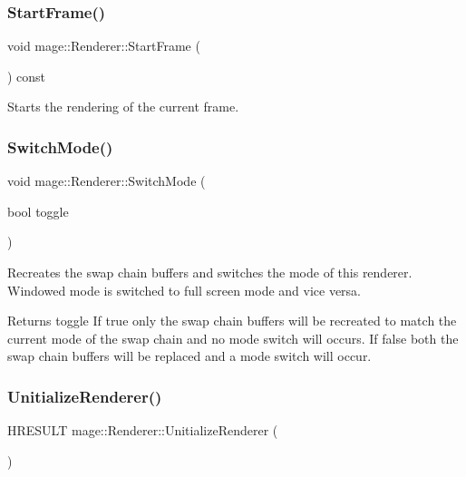 \subsubsection{\texorpdfstring{Start\+Frame()}{StartFrame()}}
{\footnotesize\ttfamily void mage\+::\+Renderer\+::\+Start\+Frame (\begin{DoxyParamCaption}{ }\end{DoxyParamCaption}) const}

Starts the rendering of the current frame. \hypertarget{classmage_1_1_renderer_a9004ab608659188900c808eacb5f873c}{}\label{classmage_1_1_renderer_a9004ab608659188900c808eacb5f873c} 
\subsubsection{\texorpdfstring{Switch\+Mode()}{SwitchMode()}}
{\footnotesize\ttfamily void mage\+::\+Renderer\+::\+Switch\+Mode (\begin{DoxyParamCaption}\item[{bool}]{toggle }\end{DoxyParamCaption})}

Recreates the swap chain buffers and switches the mode of this renderer. Windowed mode is switched to full screen mode and vice versa.

\begin{DoxyReturn}{Returns}
toggle If {\ttfamily true} only the swap chain buffers will be recreated to match the current mode of the swap chain and no mode switch will occurs. If {\ttfamily false} both the swap chain buffers will be replaced and a mode switch will occur. 
\end{DoxyReturn}
\hypertarget{classmage_1_1_renderer_a308beaf67b11128f02e87778b6a9c3c7}{}\label{classmage_1_1_renderer_a308beaf67b11128f02e87778b6a9c3c7} 
\subsubsection{\texorpdfstring{Unitialize\+Renderer()}{UnitializeRenderer()}}
{\footnotesize\ttfamily H\+R\+E\+S\+U\+LT mage\+::\+Renderer\+::\+Unitialize\+Renderer (\begin{DoxyParamCaption}{ }\end{DoxyParamCaption})\hspace{0.3cm}{\ttfamily [protected]}}


